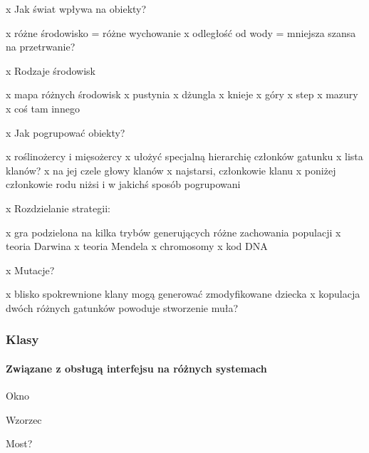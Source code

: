 x Jak świat wpływa na obiekty? \begin{DoxyVerb}    x różne środowisko = różne wychowanie
    x odległość od wody = mniejsza szansa na przetrwanie?
\end{DoxyVerb}


x Rodzaje środowisk \begin{DoxyVerb}    x mapa różnych środowisk
    x pustynia
    x dżungla
    x knieje
    x góry
    x step
    x mazury
    x coś tam innego
\end{DoxyVerb}


x Jak pogrupować obiekty? \begin{DoxyVerb}    x roślinożercy i mięsożercy
    x ułożyć specjalną hierarchię członków gatunku
    x lista klanów? 
            x na jej czele głowy klanów
            x najstarsi, członkowie klanu
            x poniżej członkowie rodu niżsi i w jakichś sposób pogrupowani
\end{DoxyVerb}


x Rozdzielanie strategii\-: \begin{DoxyVerb}    x gra podzielona na kilka trybów generujących różne zachowania populacji
            x teoria Darwina
            x teoria Mendela
            x chromosomy
            x kod DNA
\end{DoxyVerb}


x Mutacje? \begin{DoxyVerb}    x blisko spokrewnione klany mogą generować zmodyfikowane dziecka
    x kopulacja dwóch różnych gatunków powoduje stworzenie muła?
\end{DoxyVerb}


\subsubsection*{Klasy}

\paragraph*{Związane z obsługą interfejsu na różnych systemach}


\begin{DoxyItemize}
\item {\ttfamily Okno}
\item {\ttfamily Wzorzec}
\begin{DoxyItemize}
\item Most?
\end{DoxyItemize}
\end{DoxyItemize}

